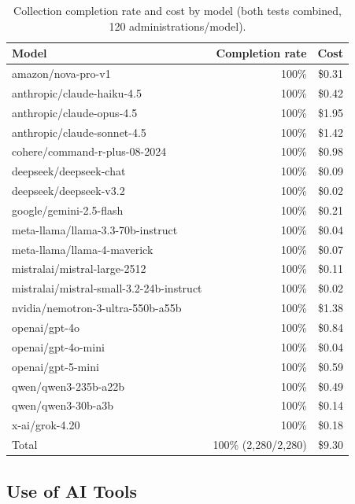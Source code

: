 \documentclass[12pt]{article}
\begin{document}
\begin{table}[H]
\centering
\caption{Collection completion rate and cost by model (both tests combined, 120 administrations/model).}
\label{stab:collection-summary}
\footnotesize
\begin{tabular}{lrr}
\toprule
Model & Completion rate & Cost \\
\midrule
amazon/nova-pro-v1 & 100\% & \$0.31 \\
anthropic/claude-haiku-4.5 & 100\% & \$0.42 \\
anthropic/claude-opus-4.5 & 100\% & \$1.95 \\
anthropic/claude-sonnet-4.5 & 100\% & \$1.42 \\
cohere/command-r-plus-08-2024 & 100\% & \$0.98 \\
deepseek/deepseek-chat & 100\% & \$0.09 \\
deepseek/deepseek-v3.2 & 100\% & \$0.02 \\
google/gemini-2.5-flash & 100\% & \$0.21 \\
meta-llama/llama-3.3-70b-instruct & 100\% & \$0.04 \\
meta-llama/llama-4-maverick & 100\% & \$0.07 \\
mistralai/mistral-large-2512 & 100\% & \$0.11 \\
mistralai/mistral-small-3.2-24b-instruct & 100\% & \$0.02 \\
nvidia/nemotron-3-ultra-550b-a55b & 100\% & \$1.38 \\
openai/gpt-4o & 100\% & \$0.84 \\
openai/gpt-4o-mini & 100\% & \$0.04 \\
openai/gpt-5-mini & 100\% & \$0.59 \\
qwen/qwen3-235b-a22b & 100\% & \$0.49 \\
qwen/qwen3-30b-a3b & 100\% & \$0.14 \\
x-ai/grok-4.20 & 100\% & \$0.18 \\
\midrule
Total & 100\% (2{,}280/2{,}280) & \$9.30 \\
\bottomrule
\end{tabular}
\end{table}

\subsection{Use of AI Tools}
\label{si:ai-use}
\end{document}
